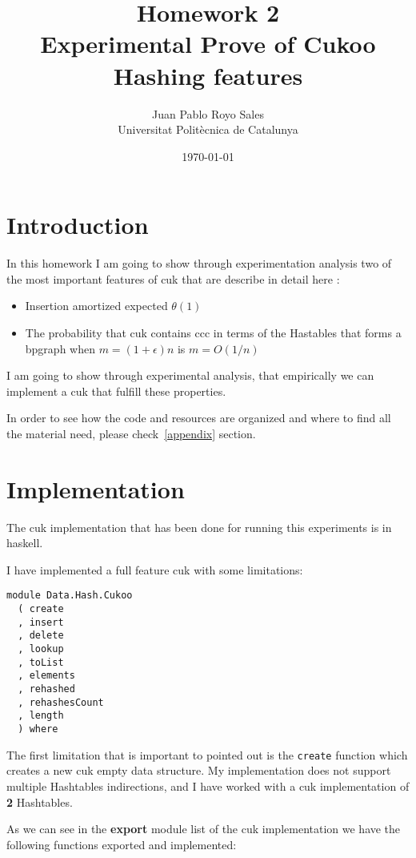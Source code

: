 \documentclass[12pt, a4paper]{article}
\title{%
      Homework 2 \\
      Experimental Prove of Cukoo Hashing features
}
\author{%
  Juan Pablo Royo Sales \\
  \small{Universitat Politècnica de Catalunya}
}
\date\today
\begin{document}
\maketitle

\section{Introduction}
In this homework I am going to show through experimentation analysis two of the most important features of \acrfull{cuk} that are describe in detail here \cite{cukoo}:

\begin{itemize}
  \item Insertion amortized expected $\theta(1)$
  \item The probability that \acrshort{cuk} contains \acrfull{ccc} in terms of the Hastables that forms a \acrfull{bpgraph} when $m = (1+\epsilon)n$ is $m =O(1/n)$ \cite{kutze}
\end{itemize}

I am going to show through experimental analysis, that empirically we can implement a \acrshort{cuk} that fulfill these properties.

In order to see how the code and resources are organized and where to find all the material need, please check~\ref{appendix} section.

\section{Implementation}
The \acrshort{cuk} implementation that has been done for running this experiments is in \acrfull{haskell}.

I have implemented a full feature \acrshort{cuk} with some limitations:

\begin{verbatim}
module Data.Hash.Cukoo
  ( create
  , insert
  , delete
  , lookup
  , toList
  , elements
  , rehashed
  , rehashesCount
  , length
  ) where
\end{verbatim}

The first limitation that is important to pointed out is the \texttt{create} function which creates a new \acrshort{cuk} empty data structure. My implementation does not support multiple Hashtables indirections, and I have worked with a \acrshort{cuk} implementation of \textbf{2} Hashtables.

As we can see in the \textbf{export} module list of the \acrshort{cuk} implementation we have the following functions exported and implemented:
\end{document}
